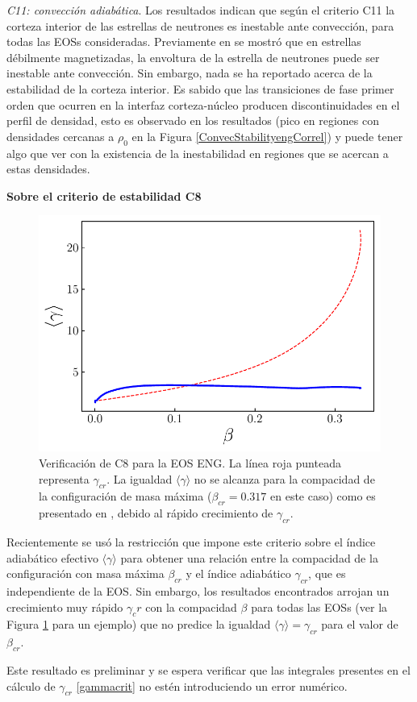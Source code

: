 \emph{C11: convección adiabática}. Los resultados indican que según el criterio C11 la corteza interior de las estrellas de neutrones es inestable ante convección, para todas las EOSs consideradas. Previamente en \cite{Miralles1997} se mostró que en estrellas débilmente magnetizadas, la envoltura de la estrella de neutrones puede ser inestable ante convección. Sin embargo, nada se ha reportado acerca de la estabilidad de la corteza interior. Es sabido \cite{Haensel2007} que las transiciones de fase primer orden que ocurren en la interfaz corteza-núcleo producen discontinuidades en el perfil de densidad, esto es observado en los resultados (pico en regiones con densidades cercanas a $\rho_0$ en la Figura \ref{ConvecStabilityengCorrel}) y puede tener algo que ver con la existencia de la inestabilidad en regiones que se acercan a estas densidades.

\vspace{0.3cm}
\noindent\textbf{Sobre el criterio de estabilidad C8}

\begin{figure}%
    \centering
    \includegraphics[width=0.6\linewidth]{figures/AdiabaticIndexENGbeta.pdf}
    \caption[Estabilidad usando el índice adiabático]{Verificación de C8 para la EOS ENG. La línea roja punteada representa $\gamma_{cr}$. La igualdad $\langle \gamma \rangle$ no se alcanza para la compacidad de la configuración de masa máxima ($\beta_{cr}=0.317$ en este caso) como es presentado en \cite{Koliogiannis2019a}, debido al rápido crecimiento de $\gamma_{cr}$.} 
    \label{AdiabaticIndexCriterio}
\end{figure}

\noindent Recientemente \cite{Koliogiannis2019a} se usó la restricción que impone este criterio sobre el índice adiabático efectivo $\langle \gamma \rangle$ para obtener una relación entre la compacidad de la configuración con masa máxima $\beta_{cr}$ y el índice adiabático $\gamma_{cr}$, que es independiente de la EOS. Sin embargo, los resultados encontrados arrojan un crecimiento muy rápido $\gamma_cr$ con la compacidad $\beta$ para todas las EOSs (ver la Figura \ref{AdiabaticIndexCriterio} para un ejemplo) que no predice la igualdad $\langle \gamma \rangle = \gamma_{cr}$ para el valor de $\beta_{cr}$.

Este resultado es preliminar y se espera verificar que las integrales presentes en el cálculo de $\gamma_{cr}$ \eqref{gammacrit} no estén introduciendo un error numérico.